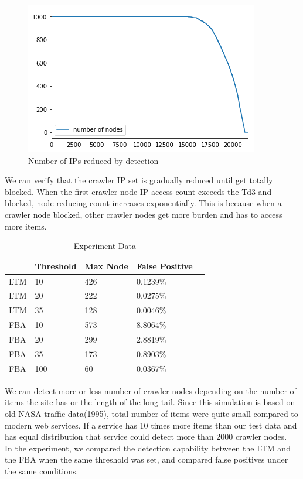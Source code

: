 \documentclass[sigconf,anonymous=true]{acmart}
\begin{document}
\begin{figure}[H]
    \centering
    \includegraphics[width=0.7\columnwidth]{figs/figure_06_nr.png}
    \caption{Number of IPs reduced by detection}
    \label{fig:fig7}
\end{figure}


We can verify that the crawler IP set is gradually reduced until get totally blocked. When the first crawler node IP access count exceeds the Td3 and blocked, node reducing count increases exponentially. This is because when a crawler node blocked, other crawler nodes get more burden and has to access more items.
\newline

\begin{table}[H]
  \caption{Experiment Data}
    \begin{tabular}{| l | l | l | l | l | }
    \hline
    & Threshold & Max Node & False Positive \\ \hline
    LTM & 10 & 426 & 0.1239\% \\ 
    LTM & 20 & 222 & 0.0275\% \\ 
    LTM & 35 & 128 & 0.0046\% \\ 
    FBA & 10 & 573 & 8.8064\% \\
    FBA & 20 & 299 & 2.8819\% \\ 
    FBA & 35 & 173 & 0.8903\% \\ 
    FBA & 100 & 60 & 0.0367\% \\ \hline
    \end{tabular}
\end{table}

We can detect more or less number of crawler nodes depending on the number of items the site has or the length of the long tail. Since this simulation is based on old NASA traffic data(1995), total number of items were quite small compared to modern web services. If a service has 10 times more items than our test data and has equal distribution that service could detect more than 2000 crawler nodes.\\
In the experiment, we compared the detection capability between the LTM and the FBA when the same threshold was set, and compared false positives under the same conditions.
\end{document}
